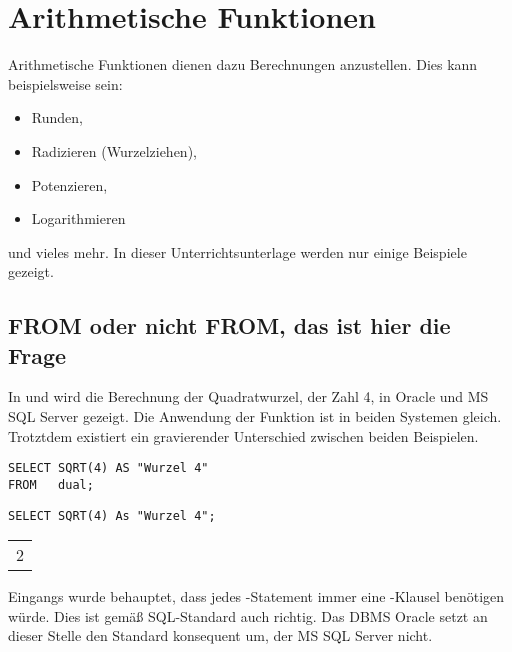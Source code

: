 \section{Arithmetische Funktionen}
Arithmetische Funktionen dienen dazu Berechnungen anzustellen. Dies kann
beispielsweise sein:
\begin{itemize}
    \item Runden,
    \item Radizieren (Wurzelziehen),
    \item Potenzieren,
    \item Logarithmieren
\end{itemize}
und vieles mehr. In dieser Unterrichtsunterlage werden nur einige
Beispiele gezeigt.
\subsection{FROM oder nicht FROM, das ist hier die Frage}
In  und  wird die Berechnung der
Quadratwurzel, der Zahl 4, in Oracle und MS SQL Server gezeigt. Die
Anwendung der Funktion  ist in beiden Systemen
gleich. Trotztdem existiert ein gravierender Unterschied zwischen beiden
Beispielen.
\begin{lstlisting}[language=oracle_sql,caption={Berechnung der Quadartwurzel, der Zahl 4, in Oracle},label=sql03_12]
SELECT SQRT(4) AS "Wurzel 4"
FROM   dual;
        \end{lstlisting}
\begin{lstlisting}[language=ms_sql,caption={Berechnung der Quadratwurzel, der Zahl 4, in MS SQL Server},label=sql03_13]
SELECT SQRT(4) As "Wurzel 4";
        \end{lstlisting}
\begin{center}
    \begin{small}
        \tablehead{}
        \begin{msoraclesql}
            \begin{supertabular}{r}
                2 \\
            \end{supertabular}
        \end{msoraclesql}
    \end{small}
\end{center}
Eingangs wurde behauptet, dass jedes \SELECT-Statement immer eine
\FROM-Klausel benötigen würde. Dies ist gemäß SQL-Standard
auch richtig. Das DBMS Oracle setzt an dieser Stelle den Standard
konsequent um, der MS SQL Server nicht.

